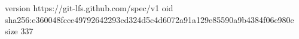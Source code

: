 version https://git-lfs.github.com/spec/v1
oid sha256:e360048fcce49792642293cd324d5c4d6072a91a129e85590a9b4384f06e980e
size 337
